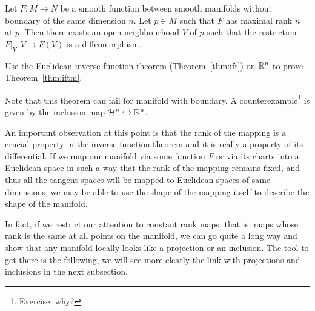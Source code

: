 \begin{theorem}\label{thm:iftm}
  Let $F:M\to N$ be a smooth function between smooth manifolds without boundary of the same dimension $n$.
  Let $p\in M$ such that $F$ has maximal rank $n$ at $p$.
  Then there exists an open neighbourhood $V$ of $p$ such that the restriction $F|_V : V\to F(V)$ is a diffeomorphism.
\end{theorem}
\begin{exercise}
Use the Euclidean inverse function theorem (Theorem~\ref{thm:ift}) on $\mathbb{R}^n$ to prove Theorem~\ref{thm:iftm}.
\end{exercise}

Note that this theorem can fail for manifold with boundary.
A counterexample\footnote{Exercise: why?} is given by the inclusion map $\mathcal{H}^n \hookrightarrow \mathbb{R}^n$.

An important observation at this point is that the rank of the mapping
is a crucial property in the inverse function theorem and it is really a
property of its differential.
If we map our manifold via some function $F$ or via its charts into a
Euclidean space in such a way that the rank of the mapping remains fixed,
and thus all the tangent spaces will be mapped to Euclidean spaces of same dimensions,
we may be able to use the shape of the mapping itself to describe the
shape of the manifold.

In fact, if we restrict our attention to constant rank maps, that is,
maps whose rank is the same at all points on the manifold, we can go quite a
long way and show that any manifold locally looks like a projection or an inclusion.
The tool to get there is the following, we will see more clearly the link with
projections and inclusions in the next subsection.

